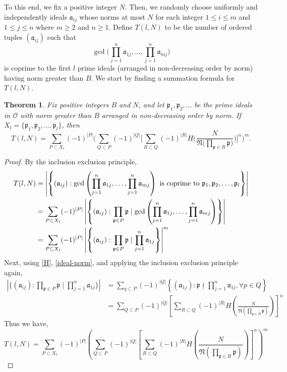 \documentclass[10pt,a4paper]{article}
\newtheorem{theorem}{Theorem}[section]
\theoremstyle{definition}
\theoremstyle{remark}
\newcommand{\f}[1]{\mathfrak{#1}}
\begin{document}
\vspace{.1 in}

To this end, we fix a positive integer $N$. Then, we randomly choose uniformly and independently ideals $\mathfrak{a}_{ij}$ whose norms at most $N$ for each integer $1 \leq i \leq m$ and $1 \leq j \leq n$ where $m \geq 2$ and $n \geq 1$. Define $T(l,N)$ to be the number of ordered tuples $(\mathfrak{a}_{ij})$ such that 
$$\gcd\Big(\prod_{j=1}^n \mathfrak{a}_{1j}, ..., \prod_{j=1}^n \mathfrak{a}_{mj}\Big)$$
is coprime to the first $l$ prime ideals (arranged in non-decreasing order by norm) having norm greater than $B$. We start by finding a summation formula for $T(l,N)$.

\begin{theorem} Fix positive integers $B$ and $N$, and let $\mathfrak{p}_1, \mathfrak{p}_2, ...$ be the prime ideals in $\mathcal{O}$ with norm greater than $B$ arranged in non-decreasing order by norm. If $X_l = \{\mathfrak{p}_1, \mathfrak{p}_2, ..., \mathfrak{p}_l\}$, then
$$T(l,N) = \sum_{P\subset X_l}(-1)^{|P|} \Big(\sum_{Q\subset P} (-1)^{|Q|} \Big[\sum_{R\subset Q}(-1)^{|R|} H\Big(\frac{N}{\f{N}\Big(\prod_{\f{p}\in R}\f{p}\Big)} \Big) \Big]^n \Big)^m.$$
\end{theorem}

\begin{proof}
By the inclusion exclusion principle, 
		\begin{align}
			T(l,N)&=\left|\left\{(\f{a}_{ij}): \gcd\left(\prod_{j=1}^{n}\f{a}_{1j},\mathellipsis,\prod_{j=1}^{n}\f{a}_{mj}\right)\text{ is coprime to } \f{p}_1,\f{p}_2,\mathellipsis,\f{p}_l\right\}\right|\\
			&= \sum_{P\subset X_l}(-1)^{|P|}\left|\left\{(\f{a}_{ij}): \prod_{\f{p}\in P} \f{p} \mid \gcd\left(\prod_{j=1}^{n}\f{a}_{1j},\mathellipsis, \prod_{j=1}^{n}\f{a}_{mj}\right)\right\}\right|\\
			&=\sum_{P\subset X_l}(-1)^{|P|}\left|\left\{(\f{a}_{ij}): \prod_{\f{p}\in P} \f{p} \mid \prod_{j=1}^{n}\f{a}_{1j}\right\}\right|^m
		\end{align}
		 Next, using \cref{H}, \cref{ideal-norm}, and applying the inclusion exclusion principle again,
		\begin{align}
			\left|\Biggl\{(\f{a}_{ij}): \prod_{\f{p}\in P} \f{p} \mid \prod_{j=1}^{n} \f{a}_{1j}\Biggr\}\right| &=\sum_{q\subset P}(-1)^{|Q|}\left\{(\f{a}_{1j}): \f{p}\nmid \prod_{j=1}^n\f{a}_{1j}, \forall p\in Q\right\} \\ 
			&=\sum_{Q\subset P} (-1)^{|Q|}\left[\sum_{R\subset Q}(-1)^{|R|}H\left(\frac{N}{\f{N}\left(\prod_{\f{p}\in R}\f{p}\right)}\right)\right]^n
		\end{align}
	Thus we have, 
	\begin{equation}
		T(l,N) = \sum_{P\subset X_l}(-1)^{|P|} \left(\sum_{Q\subset P} (-1)^{|Q|} \left[\sum_{R\subset Q}(-1)^{|R|}H\left(\frac{N}{\f{N}\left(\prod_{\f{p}\in R}\f{p}\right)}\right)\right]^n\right)^m
	\end{equation}
	\end{proof}
\end{document}
